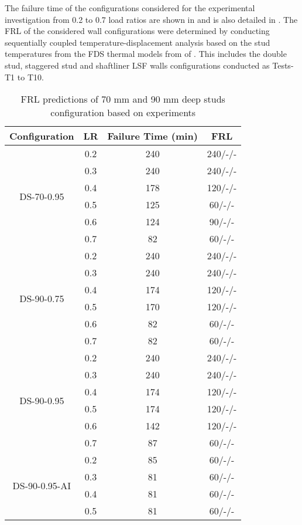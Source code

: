 The failure time of the configurations considered for the experimental investigation from 0.2 to 0.7 load ratios are shown in  and is also detailed in . The FRL of the considered wall configurations were determined by conducting sequentially coupled temperature-displacement analysis based on the stud temperatures from the FDS thermal models from  of . This includes the double stud, staggered stud and shaftliner LSF walls configurations conducted as Tests-T1 to T10. 
\begin{table}[!htbp]
	\centering
	\caption{FRL predictions of 70 mm and 90 mm deep studs configuration based on experiments}
	  \begin{tabular}{cccc}
	  \toprule
	  Configuration & LR    & Failure Time (min) & FRL \\
	  \midrule
	  \multirow{6}[2]{*}{DS-70-0.95} & 0.2   & 240   & 240/-/- \\
			& 0.3   & 240   & 240/-/- \\
			& 0.4   & 178 & 120/-/- \\
			& 0.5   & 125 & 60/-/- \\
			& 0.6   & 124 & 90/-/- \\
			& 0.7   & 82 & 60/-/- \\
	  \midrule
	  \multirow{6}[2]{*}{DS-90-0.75} & 0.2   & 240   & 240/-/- \\
			& 0.3   & 240   & 240/-/- \\
			& 0.4   & 174 & 120/-/- \\
			& 0.5   & 170   & 120/-/- \\
			& 0.6   & 82    & 60/-/- \\
			& 0.7   & 82    & 60/-/- \\
	  \midrule
	  \multirow{6}[2]{*}{DS-90-0.95} & 0.2   & 240   & 240/-/- \\
			& 0.3   & 240   & 240/-/- \\
			& 0.4   & 174 & 120/-/- \\
			& 0.5   & 174 & 120/-/- \\
			& 0.6   & 142 & 120/-/- \\
			& 0.7   & 87 & 60/-/- \\
	  \midrule
	  \multirow{6}[2]{*}{DS-90-0.95-AI} & 0.2   & 85 & 60/-/- \\
			& 0.3   & 81 & 60/-/- \\
			& 0.4   & 81  & 60/-/- \\
			& 0.5   & 81 & 60/-/- \\

\end{tabular}
\end{table}
